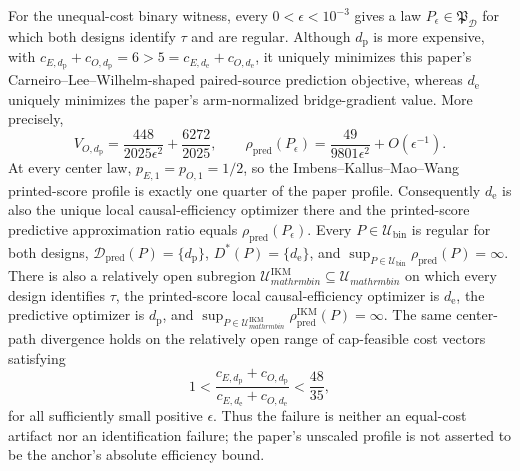 For the unequal-cost binary witness, every \(0<\epsilon<10^{-3}\) gives a law \(P_\epsilon\in\mathfrak P_{\mathcal D}\) for which both designs identify \(\tau\) and are regular. Although \(d_{\mathrm p}\) is more expensive, with \(c_{E,d_{\mathrm p}}+c_{O,d_{\mathrm p}}=6>5=c_{E,d_{\mathrm e}}+c_{O,d_{\mathrm e}}\), it uniquely minimizes this paper's Carneiro--Lee--Wilhelm-shaped paired-source prediction objective, whereas \(d_{\mathrm e}\) uniquely minimizes the paper's arm-normalized bridge-gradient value. More precisely,
\[
 V_{O,d_{\mathrm p}}=\frac{448}{2025\epsilon^2}+\frac{6272}{2025},\qquad
 \rho_{\mathrm{pred}}(P_\epsilon)=\frac{49}{9801\epsilon^2}+O(\epsilon^{-1}).
\]
At every center law, \(p_{E,1}=p_{O,1}=1/2\), so the Imbens--Kallus--Mao--Wang printed-score profile is exactly one quarter of the paper profile. Consequently \(d_{\mathrm e}\) is also the unique local causal-efficiency optimizer there and the printed-score predictive approximation ratio equals \(\rho_{\mathrm{pred}}(P_\epsilon)\). Every \(P\in\mathcal U_{\mathrm{bin}}\) is regular for both designs, \(\mathcal D_{\mathrm{pred}}(P)=\{d_{\mathrm p}\}\), \(D^*(P)=\{d_{\mathrm e}\}\), and \(\sup_{P\in\mathcal U_{\mathrm{bin}}}\rho_{\mathrm{pred}}(P)=\infty\). There is also a relatively open subregion \(\mathcal U_{mathrm{bin}}^{\mathrm{IKM}}\subseteq\mathcal U_{mathrm{bin}}\) on which every design identifies \(\tau\), the printed-score local causal-efficiency optimizer is \(d_{\mathrm e}\), the predictive optimizer is \(d_{\mathrm p}\), and \(\sup_{P\in\mathcal U_{mathrm{bin}}^{\mathrm{IKM}}}\rho_{\mathrm{pred}}^{\mathrm{IKM}}(P)=\infty\). The same center-path divergence holds on the relatively open range of cap-feasible cost vectors satisfying
\[
 1<\frac{c_{E,d_{\mathrm p}}+c_{O,d_{\mathrm p}}}
 {c_{E,d_{\mathrm e}}+c_{O,d_{\mathrm e}}}<\frac{48}{35},
\]
for all sufficiently small positive \(\epsilon\). Thus the failure is neither an equal-cost artifact nor an identification failure; the paper's unscaled profile is not asserted to be the anchor's absolute efficiency bound.